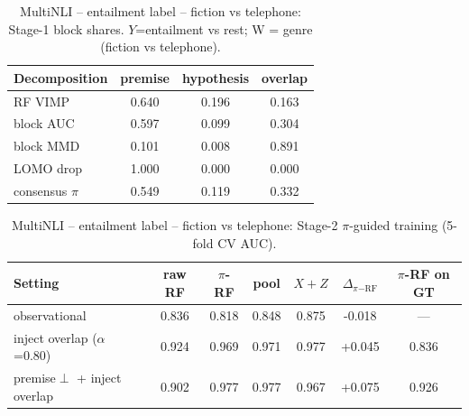 \begin{table}[t]
\centering
\small
\caption{MultiNLI  --  entailment label  --  fiction vs telephone: Stage-1 block shares. $Y$=entailment vs rest; W = genre (fiction vs telephone).}
\begin{tabular}{lccc}
\toprule
Decomposition & premise & hypothesis & overlap \\
\midrule
RF VIMP & 0.640 & 0.196 & 0.163 \\
block AUC & 0.597 & 0.099 & 0.304 \\
block MMD & 0.101 & 0.008 & 0.891 \\
LOMO drop & 1.000 & 0.000 & 0.000 \\
consensus $\pi$ & 0.549 & 0.119 & 0.332 \\
\bottomrule
\end{tabular}
\end{table}

\begin{table}[t]
\centering
\small
\caption{MultiNLI  --  entailment label  --  fiction vs telephone: Stage-2 $\pi$-guided training (5-fold CV AUC).}
\begin{tabular}{lcccccc}
\toprule
Setting & raw RF & $\pi$-RF & pool & $X{+}Z$ & $\Delta_{\pi\mathrm{-RF}}$ & $\pi$-RF on GT \\
\midrule
observational & 0.836 & 0.818 & 0.848 & 0.875 & -0.018 & --- \\
inject overlap ($\alpha$=0.80) & 0.924 & 0.969 & 0.971 & 0.977 & +0.045 & 0.836 \\
premise$\perp$ + inject overlap & 0.902 & 0.977 & 0.977 & 0.967 & +0.075 & 0.926 \\
\bottomrule
\end{tabular}
\end{table}

